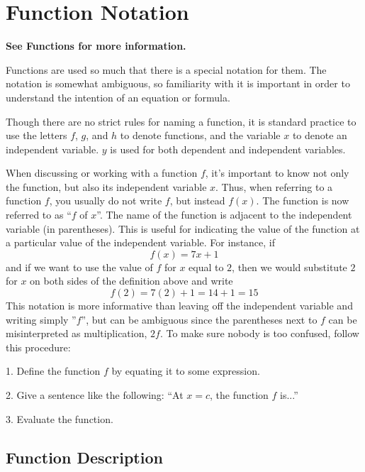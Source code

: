 \section{Function Notation}
\label{sec:func-4102}


\textbf{See Functions for more information.}

Functions are used so much that there is a special notation for them. The notation is
somewhat ambiguous, so familiarity with it is important in order to understand the
intention of an equation or formula.

Though there are no strict rules for naming a function, it is standard practice to use the letters $f$, $g$, and $h$ to denote functions, and the variable $x$ to denote an independent variable. $y$ is used for both dependent and independent variables.

When discussing or working with a function $f$, it's important to know not only the function, but also its independent variable $x$. Thus, when referring to a function $f$, you usually do not write $f$, but instead $f(x)$. The function is now referred to as ``$f$ of $x$''. The name of the function is adjacent to the independent variable (in parentheses). This is useful for indicating the value of the function at a particular value of the independent variable. For instance, if
\[
f(x) = 7x + 1
\]
and if we want to use the value of $f$ for $x$ equal to $2$, then we would substitute $2$ for $x$ on both sides of the definition above and write
\[
f(2) = 7(2) + 1 = 14 + 1 = 15
\]
This notation is more informative than leaving off the independent variable and writing simply ''$f$'', but can be ambiguous since the parentheses next to $f$ can be misinterpreted as multiplication, $2f$. To make sure nobody is too confused, follow this procedure:

1. Define the function $f$ by equating it to some expression.

2. Give a sentence like the following: ``At $x = c$, the function $f$ is...''

3. Evaluate the function.

\subsection{Function Description}
\label{sss:func-987a}

